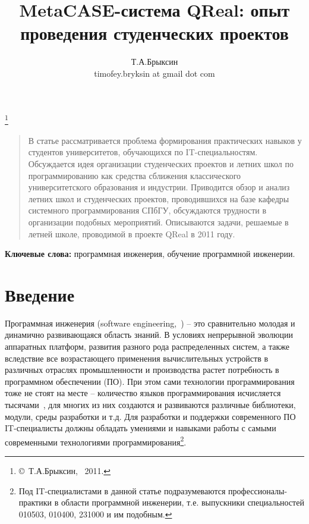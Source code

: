 \documentclass[a5paper]{article}
\title{MetaCASE-система QReal: опыт проведения студенческих проектов}
\author{Т.А.Брыксин \\ timofey.bryksin at gmail dot com}
\date{}
\begin{document}
\maketitle
\thispagestyle{empty}


\renewcommand{\thefootnote}{}
\footnote{\small{\copyright~Т.А.Брыксин, ~2011.}}
\renewcommand{\thefootnote}{\arabic{footnote}}
\setcounter{footnote}{0}



\begin{quote}
\small\noindent
В статье рассматривается проблема формирования практических навыков у студентов университетов, обучающихся по IT-специальностям. Обсуждается идея организации студенческих проектов и летних школ по программированию как средства сближения классического университетского образования и индустрии. Приводится обзор и анализ летних школ и студенческих проектов, проводившихся на базе кафедры системного программирования СПбГУ, обсуждаются трудности в организации подобных мероприятий. Описываются задачи, решаемые в летней школе, проводимой в проекте QReal в 2011 году. 
\end{quote}

{\bf Ключевые слова:} программная инженерия, обучение программной инженерии.


\section*{Введение} 
Программная инженерия (software engineering,~\cite{terekhov1, swebok}) -- это сравнительно молодая и динамично развивающаяся область знаний. В условиях непрерывной эволюции аппаратных платформ, развития разного рода распределенных систем, а также вследствие все возрастающего применения вычислительных устройств в различных отраслях промышленности и производства растет потребность в программном обеспечении (ПО).  При этом сами технологии программирования тоже не стоят на месте -- количество языков программирования исчисляется тысячами~\cite{langList}, для многих из них создаются и развиваются различные библиотеки, модули, среды разработки и т.д. Для разработки и поддержки современного ПО IT-специалисты должны обладать умениями и навыками работы с самыми современными технологиями программирования\footnote{Под IT-специалистами в данной статье подразумеваются профессионалы-практики в области программной инженерии, т.е. выпускники специальностей 010503, 010400, 231000 и им подобным.}. 
 
\end{document}
